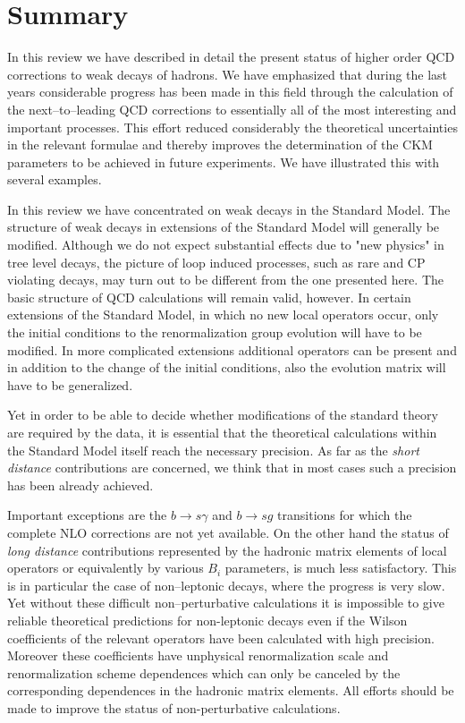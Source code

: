 \section{Summary}
        \label{sec:summary}
In this review we have described in detail the present status of higher
order QCD corrections to weak decays of hadrons. We have emphasized
that during the last years considerable progress has been made in this
field through the calculation of the next--to--leading QCD corrections
to essentially all of the most interesting and important processes.
This effort reduced considerably the theoretical uncertainties in the
relevant formulae and thereby improves the determination of the CKM
parameters to be achieved in future experiments. We have illustrated
this with several examples.

In this review we have concentrated on weak decays in the Standard
Model.  The structure of weak decays in extensions of the Standard
Model will generally be modified. Although we do not expect substantial
effects due to "new physics" in tree level decays, the picture of loop
induced processes, such as rare and CP violating decays, may turn out
to be different from the one presented here. The basic structure of QCD
calculations will remain valid, however. In certain extensions of the
Standard Model, in which no new local operators occur, only the initial
conditions to the renormalization group evolution will have to be
modified. In more complicated extensions additional operators can be
present and in addition to the change of the initial conditions, also
the evolution matrix will have to be generalized.

Yet in order to be able to decide whether modifications of the standard
theory are required by the data, it is essential that the theoretical
calculations within the Standard Model itself reach the necessary
precision.  As far as the {\it short distance}
contributions are concerned, we think that in most cases such a
precision has been already achieved.

Important exceptions are the $b \to s \gamma$ and $b \to s g$
transitions for which the complete NLO corrections are not yet
available.  On the other hand the status of {\it long distance}
contributions represented by the hadronic matrix elements of local
operators or equivalently by various $B_i$ parameters, is much less
satisfactory. This is in particular the case of non--leptonic decays,
where the progress is very slow. Yet without these difficult
non--perturbative calculations it is impossible to give reliable
theoretical predictions for non-leptonic decays even if the Wilson
coefficients of the relevant operators have been calculated with high
precision. Moreover these coefficients have unphysical renormalization
scale and renormalization scheme dependences which can only be canceled
by the corresponding dependences in the hadronic matrix elements. All
efforts should be made to improve the status of non-perturbative
calculations.

